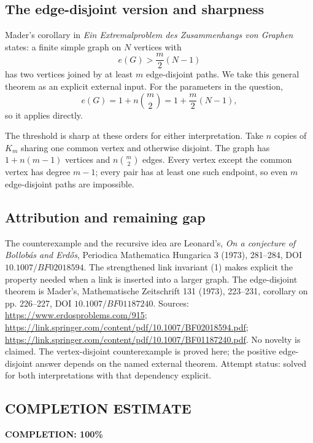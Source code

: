 \subsection*{The edge-disjoint version and sharpness}
Mader's corollary in \emph{Ein Extremalproblem des Zusammenhangs von Graphen} states:
a finite simple graph on \(N\) vertices with
\[
 e(G)>\frac m2(N-1)
\]
has two vertices joined by at least \(m\) edge-disjoint paths.
We take this general theorem as an explicit external input.
For the parameters in the question,
\[
 e(G)=1+n\binom m2=1+\frac m2(N-1),
\]
so it applies directly.

The threshold is sharp at these orders for either interpretation.
Take \(n\) copies of \(K_m\) sharing one common vertex and otherwise disjoint.
The graph has \(1+n(m-1)\) vertices and \(n\binom m2\) edges.
Every vertex except the common vertex has degree \(m-1\); every pair has at least one such endpoint, so even \(m\) edge-disjoint paths are impossible.

\subsection*{Attribution and remaining gap}
The counterexample and the recursive idea are Leonard's, \emph{On a conjecture of Bollob\'as and Erd\H{o}s}, Periodica Mathematica Hungarica 3 (1973), 281--284, DOI \(10.1007/BF02018594\).
The strengthened link invariant (1) makes explicit the property needed when a link is inserted into a larger graph.
The edge-disjoint theorem is Mader's, Mathematische Zeitschrift 131 (1973), 223--231, corollary on pp. 226--227, DOI \(10.1007/BF01187240\).
Sources: \url{https://www.erdosproblems.com/915};
\url{https://link.springer.com/content/pdf/10.1007/BF02018594.pdf};
\url{https://link.springer.com/content/pdf/10.1007/BF01187240.pdf}.
No novelty is claimed. The vertex-disjoint counterexample is proved here; the positive edge-disjoint answer depends on the named external theorem. Attempt status: solved for both interpretations with that dependency explicit.
\subsection*{COMPLETION ESTIMATE}
\textbf{COMPLETION: 100\%}
